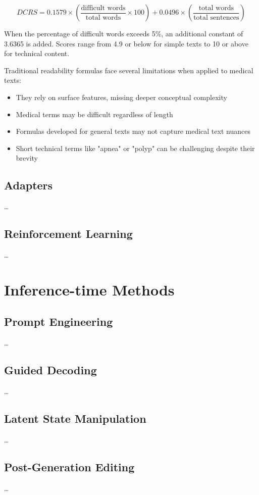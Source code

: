 \begin{equation}
    DCRS = 0.1579 \times \left(\frac{\text{difficult words}}{\text{total words}} \times 100\right) + 0.0496 \times \left(\frac{\text{total words}}{\text{total sentences}}\right)
\end{equation}

When the percentage of difficult words exceeds 5\%, an additional constant of 3.6365 is added. Scores range from 4.9 or below for simple texts to 10 or above for technical content.

Traditional readability formulas face several limitations when applied to medical texts:

\begin{itemize}
    \item They rely on surface features, missing deeper conceptual complexity
    \item Medical terms may be difficult regardless of length
    \item Formulas developed for general texts may not capture medical text nuances
    \item Short technical terms like "apnea" or "polyp" can be challenging despite their brevity
\end{itemize}



\subsection{Adapters}
\dots

\subsection{Reinforcement Learning}
\dots

\section{Inference-time Methods}
\label{c2:s:inference-time}

\subsection{Prompt Engineering}
\dots

\subsection{Guided Decoding}
\dots

\subsection{Latent State Manipulation}
\dots

\subsection{Post-Generation Editing}
\dots